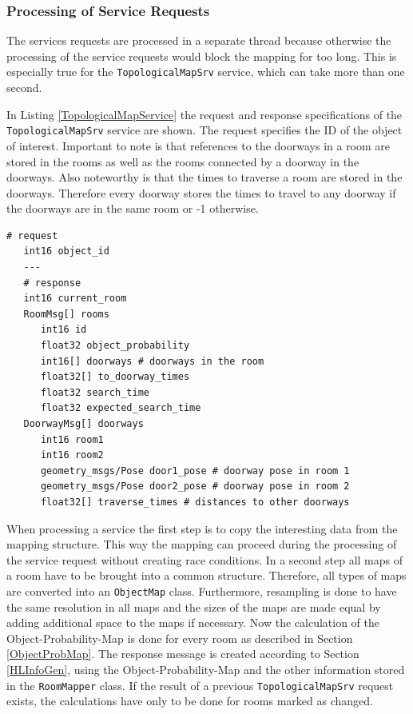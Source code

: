 \subsubsection{Processing of Service Requests}

The services requests are processed in a separate thread because otherwise the processing of the service requests would block the mapping for too long. This is especially true for the \texttt{TopologicalMapSrv} service, which can take more than one second. 

In Listing \ref{TopologicalMapService} the request and response specifications of the \linebreak \texttt{TopologicalMapSrv} service are shown. The request specifies the ID of the object of interest. Important to note is that references to the doorways in a room are stored in the rooms as well as the rooms connected by a doorway in the doorways. Also noteworthy is that the times to traverse a room are stored in the doorways. Therefore every doorway stores the times to travel to any doorway if the doorways are in the same room or -1 otherwise.

\begin{minipage}{\linewidth}
\begin{lstlisting}[caption=mapping/TopologicalMapSrv,frame=single, label=TopologicalMapService]
   # request
   int16 object_id
   ---
   # response
   int16 current_room
   RoomMsg[] rooms
      int16 id
      float32 object_probability
      int16[] doorways # doorways in the room
      float32[] to_doorway_times
      float32 search_time
      float32 expected_search_time
   DoorwayMsg[] doorways
      int16 room1
      int16 room2
      geometry_msgs/Pose door1_pose # doorway pose in room 1
      geometry_msgs/Pose door2_pose # doorway pose in room 2
      float32[] traverse_times # distances to other doorways
\end{lstlisting}
\end{minipage}

When processing a service the first step is to copy the interesting data from the mapping structure. This way the mapping can proceed during the processing of the service request without creating race conditions. In a second step all maps of a room have to be brought into a common structure. Therefore, all types of maps are converted into an \texttt{ObjectMap} class. Furthermore, resampling is done to have the same resolution in all maps and the sizes of the maps are made equal by adding additional space to the maps if necessary. Now the calculation of the Object-Probability-Map is done for every room as described in Section \ref{ObjectProbMap}. The response message is created according to Section \ref{HLInfoGen}, using the Object-Probability-Map and the other information stored in the \texttt{RoomMapper} class. If the result of a previous \texttt{TopologicalMapSrv} request exists, the calculations have only to be done for rooms marked as changed.


